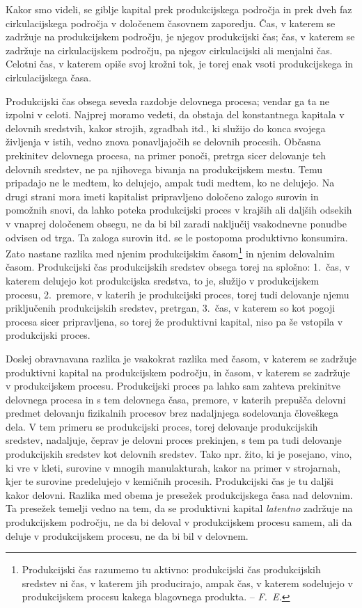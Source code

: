 \documentclass[kapital_02.tex]{subfiles}
\begin{document}
Kakor \KPEstran smo videli, se giblje kapital prek produkcijskega področja in prek dveh faz cirkulacijskega področja v določenem časovnem zaporedju. Čas, v katerem se zadržuje na produkcijskem področju, je njegov produkcijski čas; čas, v katerem se zadržuje na cirkulacijskem področju, pa njegov cirkulacijski ali menjalni čas. Celotni čas, v katerem opiše svoj krožni tok, je torej enak vsoti produkcijskega in cirkulacijskega časa.

Produkcijski čas obsega seveda razdobje delovnega procesa; vendar ga ta ne izpolni v celoti. Najprej moramo vedeti, da obstaja del konstantnega kapitala v delovnih sredstvih, kakor strojih, zgradbah itd., ki služijo do konca svojega življenja v istih, vedno znova ponavljajočih se delovnih procesih. Občasna prekinitev delovnega procesa, na primer ponoči, pretrga sicer delovanje teh delovnih sredstev, ne pa njihovega bivanja na produkcijskem mestu. Temu pripadajo ne le medtem, ko delujejo, ampak tudi medtem, ko ne delujejo. Na drugi strani mora imeti kapitalist pripravljeno določeno zalogo surovin in pomožnih snovi, da lahko poteka produkcijski proces v krajših ali daljših odsekih v vnaprej določenem obsegu, ne da bi bil zaradi naključij vsakodnevne ponudbe odvisen od trga. Ta zaloga surovin itd. se le postopoma produktivno konsumira. Zato nastane razlika med njenim produkcijskim časom\footnote{Produkcijski čas razumemo tu aktivno: produkcijski čas produkcijskih sredstev ni čas, v katerem jih producirajo, ampak čas, v katerem sodelujejo v produkcijskem procesu kakega blagovnega produkta. -- \emph{F.\ E.}} in njenim \KPEstran delovalnim časom. Produkcijski čas produkcijskih sredstev obsega torej na splošno: 1.\ čas, v katerem delujejo kot produkcijska sredstva, to je, služijo v produkcijskem procesu, 2.\ premore, v katerih je produkcijski proces, torej tudi delovanje njemu priključenih produkcijskih sredstev, pretrgan, 3.\ čas, v katerem so kot pogoji procesa sicer pripravljena, so torej že produktivni kapital, niso pa še vstopila v produkcijski proces.

Doslej obravnavana razlika je vsakokrat razlika med časom, v katerem se zadržuje produktivni kapital na produkcijskem področju, in časom, v katerem se zadržuje v produkcijskem procesu. Produkcijski proces pa lahko sam zahteva prekinitve delovnega procesa in s tem delovnega časa, premore, v katerih prepušča delovni predmet delovanju fizikalnih procesov brez nadaljnjega sodelovanja človeškega dela. V tem primeru se produkcijski proces, torej delovanje produkcijskih sredstev, nadaljuje, čeprav je delovni proces prekinjen, s tem pa tudi delovanje produkcijskih sredstev kot delovnih sredstev. Tako npr. žito, ki je posejano, vino, ki vre v kleti, surovine v mnogih manulakturah, kakor na primer v strojarnah, kjer te surovine predelujejo v kemičnih procesih. Produkcijski čas je tu daljši kakor delovni. Razlika med obema je presežek produkcijskega časa nad delovnim. Ta presežek temelji vedno na tem, da se produktivni kapital \emph{latentno} zadržuje na produkcijskem področju, ne da bi deloval v produkcijskem procesu samem, ali da deluje v produkcijskem procesu, ne da bi bil v delovnem.
\end{document}
